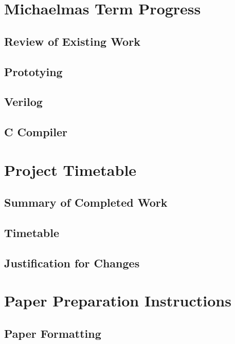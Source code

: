 \documentclass[pageno]{jpaper}
\begin{document}
\section{Michaelmas Term Progress}
\subsection{Review of Existing Work}
\subsection{Prototying}
\subsection{Verilog}
\subsection{C Compiler}

\section{Project Timetable}
\subsection{Summary of Completed Work}
\subsection{Timetable}
\subsection{Justification for Changes}

\clearpage
\section{Paper Preparation Instructions}

\subsection{Paper Formatting}
\end{document}
